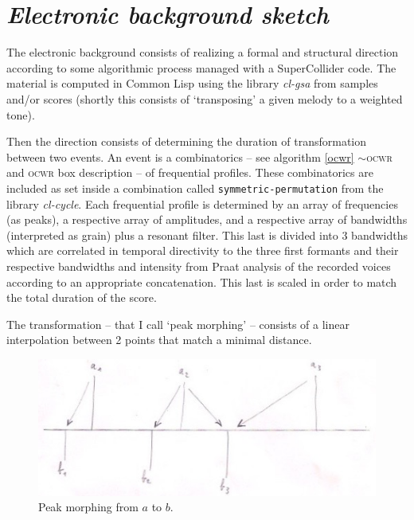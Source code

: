 \clearpage

\section{\textsl{Electronic background sketch}}

\label{imp1}

\bigskip

The electronic background consists of realizing a formal and structural direction according to some algorithmic process managed with a SuperCollider code. The material is computed in Common Lisp using the library \textsl{cl-gsa} from samples and/or scores (shortly this consists of `transposing' a given melody to a weighted tone).

Then the direction consists of determining the duration of transformation between two events. An event is a combinatorics %
 -- see  algorithm \ref{ocwr} $\sim$\textsc{ocwr} and \textsc{ocwr} box description -- of frequential profiles. These combinatorics are included as set inside a combination called \texttt{symmetric-permutation} from the library \textsl{cl-cycle}. Each frequential profile is determined by an array of frequencies (as peaks), a respective array of amplitudes, and a respective array of bandwidths (interpreted as grain) plus a resonant filter. This last is divided into 3 bandwidths which are correlated in temporal directivity to the three first formants and their respective bandwidths and intensity from Praat analysis of the recorded voices according to an appropriate concatenation. This last is scaled in order to match the total duration of the score.

\bigskip

The transformation --  that I call `peak morphing' -- consists of a linear interpolation between 2 points that match a minimal distance.

\begin{figure}[h]
\begin{center}
\includegraphics[scale=0.6]{img/9873}
\caption{Peak morphing from $a$ to $b$.}
\label{a1}
\end{center}
\end{figure}

